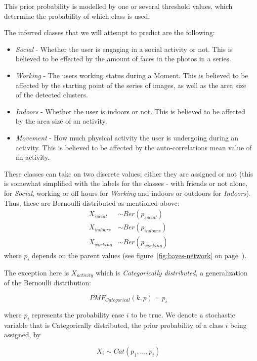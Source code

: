 This prior probability is modelled by one or several threshold values,
which determine the probability of which class is used. 

The inferred classes that we will attempt to predict are the following:
\begin{itemize}
    \item \emph{Social} - Whether the user is engaging in a social 
        activity or not. This is believed to be effected by the amount
        of faces in the photos in a series. 
    \item \emph{Working} - The users working status during a Moment. 
        This is believed to be affected by the starting point of the 
        series of images, as well as the area size of the detected
        clusters. 
    \item \emph{Indoors} - Whether the user is indoors or not. This is 
        believed to be affected by the area size of an activity.
    \item \emph{Movement} - How much physical activity the user is 
        undergoing during an activity. This is 
        believed to be affected by the auto-correlations mean value 
        of an activity.
\end{itemize}

These classes can take on two discrete values; either they are assigned
or not (this is somewhat simplified with the labels for the classes - 
with friends or not alone, for \emph{Social}, working or off hours
for \emph{Working} and indoors or outdoors for \emph{Indoors}). Thus, 
these are Bernoulli distributed as mentioned above:
\begin{equation}
    \label{eq:bernoulli-classification}
    \begin{split}
        X_{social}  &\sim Ber(p_{social})  \\
        X_{indoors} &\sim Ber(p_{indoors}) \\
        X_{working} &\sim Ber(p_{working}) 
    \end{split}
\end{equation}
where $p_i$ depends on the parent values (see 
figure~\ref{fig:bayes-network} on page~\pageref{fig:bayes-network}).

The exception here is $X_{activity}$ which is 
\emph{Categorically distributed}, a generalization of the Bernoulli
distribution:
\begin{definition}
\label{definition:categorical-pmf}
$$
    PMF_{Categorical}(k,p) = p_i
$$
\end{definition}
where $p_i$ represents the probability case $i$ to be true. 
We denote a stochastic variable that is Categorically 
distributed, the prior probability of a class $i$ being assigned, by
\begin{definition}
\label{definition:categorical-variable}
$$
    X_i \sim Cat(p_1, ..., p_i)
$$
\end{definition}

